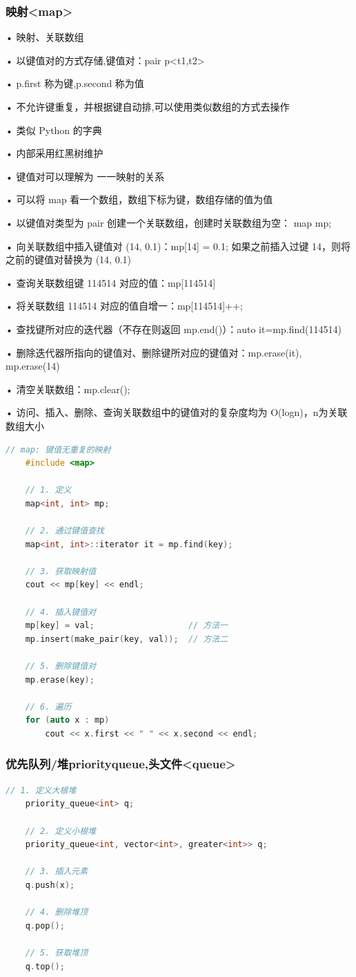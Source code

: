 \documentclass[UTF8]{ctexart}
\begin{document}
\subsubsection{映射<map>}
• 映射、关联数组 

• 以键值对的方式存储,键值对：pair p<t1,t2> 

• p.first 称为键,p.second 称为值 

• 不允许键重复，并根据键自动排,可以使用类似数组的方式去操作 

• 类似 Python 的字典 

• 内部采用红黑树维护

• 键值对可以理解为 一一映射的关系 

• 可以将 map 看一个数组，数组下标为键，数组存储的值为值 

• 以键值对类型为 pair 创建一个关联数组，创建时关联数组为空： map mp;

• 向关联数组中插入键值对 (14, 0.1)：mp[14] = 0.1; 如果之前插入过键 14，则将之前的键值对替换为 (14, 0.1) 

• 查询关联数组键 114514 对应的值：mp[114514] 

• 将关联数组 114514 对应的值自增一：mp[114514]++;  

• 查找键所对应的迭代器（不存在则返回 mp.end()）：auto it=mp.find(114514) 

• 删除迭代器所指向的键值对、删除键所对应的键值对：mp.erase(it), mp.erase(14) 

• 清空关联数组：mp.clear(); 

• 访问、插入、删除、查询关联数组中的键值对的复杂度均为 O(logn)，n为关联数组大小

\begin{lstlisting}[language=C++]
	// map: 键值无重复的映射
	#include <map>
	
	// 1. 定义
	map<int, int> mp;
	
	// 2. 通过键值查找
	map<int, int>::iterator it = mp.find(key);
	
	// 3. 获取映射值
	cout << mp[key] << endl;
	
	// 4. 插入键值对
	mp[key] = val;                   // 方法一
	mp.insert(make_pair(key, val));  // 方法二
	
	// 5. 删除键值对
	mp.erase(key);
	
	// 6. 遍历
	for (auto x : mp)
		cout << x.first << " " << x.second << endl;
	\end{lstlisting}
	

\subsubsection{优先队列/堆priority\textunderscore queue,头文件<queue>}
\begin{lstlisting}[language=C++]
	// 1. 定义大根堆
	priority_queue<int> q;
	
	// 2. 定义小根堆
	priority_queue<int, vector<int>, greater<int>> q;
	
	// 3. 插入元素
	q.push(x);
	
	// 4. 删除堆顶
	q.pop();
	
	// 5. 获取堆顶
	q.top();
	\end{lstlisting}
	
\end{document}
